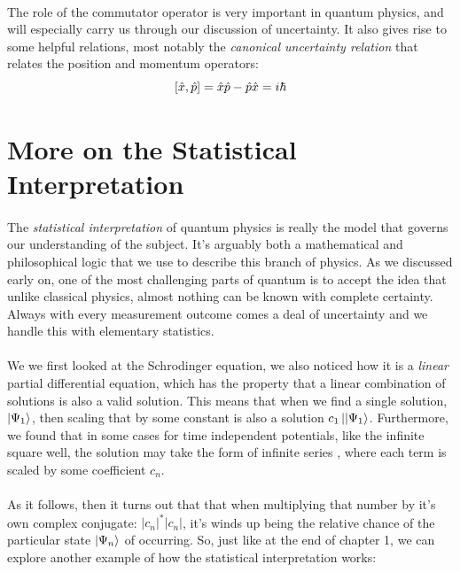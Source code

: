 \documentclass[12pt,letterpaper]{book}
\begin{document}
\paragraph*{}The role of the commutator operator is very important in quantum physics, and will especially carry us through our discussion of uncertainty. It also gives rise to some helpful relations, most notably the \textit{canonical uncertainty relation} that relates the position and momentum operators:
\begin{equation}
\comm{\hat{x}}{\hat{p}} = \hat{x}\hat{p} - \hat{p}\hat{x} = i\hbar
\end{equation}



\section{More on the Statistical Interpretation}

\paragraph*{}The \textit{statistical interpretation} of quantum physics is really the model that governs our understanding of the subject. It's arguably both a mathematical and philosophical logic that we use to describe this branch of physics. As we discussed early on, one of the most challenging parts of quantum is to accept the idea that unlike classical physics, almost nothing can be known with complete certainty. Always with every measurement outcome comes a deal of uncertainty and we handle this with elementary statistics.
\paragraph*{}We we first looked at the Schrodinger equation, we also noticed how it is a \textit{linear} partial differential equation, which has the property that a linear combination of solutions is also a valid solution. This means that when we find a single solution, $\ket{\Psi_1}$, then scaling that by some constant is also a solution $c_1\ket{|\Psi_1}$. Furthermore, we found that in some cases for time independent potentials, like the infinite square well, the solution may take the form of infinite series , where each term is scaled by some coefficient $c_n$. 
\paragraph*{}As it follows, then it turns out that that when multiplying that number by it's own complex conjugate: $|c_n|^*|c_n|$, it's winds up being the relative chance of the particular state $\ket{\Psi_n}$ of occurring. So, just like at the end of chapter 1, we can explore another example of how the statistical interpretation works: \\
\end{document}
